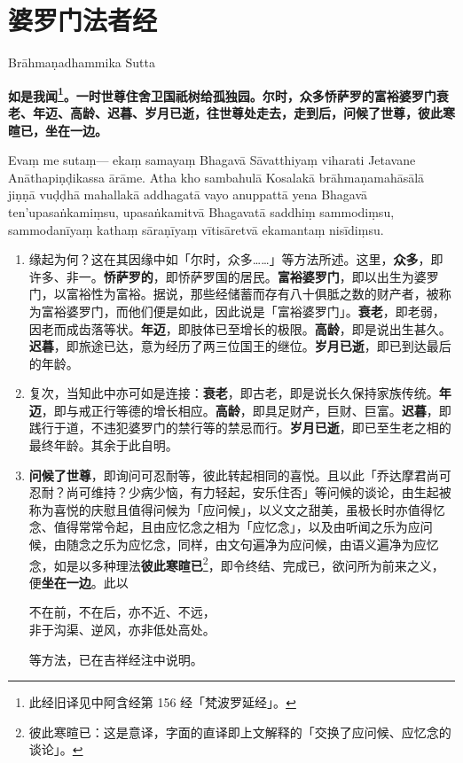 \section{婆罗门法者经}

\begin{center}Brāhmaṇadhammika Sutta\end{center}\vspace{1em}

\textbf{如是我闻\footnote{此经旧译见中阿含经第 156 经「梵波罗延经」。}。一时世尊住舍卫国祇树给孤独园。尔时，众多㤭萨罗的富裕婆罗门衰老、年迈、高龄、迟暮、岁月已逝，往世尊处走去，走到后，问候了世尊，彼此寒暄已，坐在一边。}

Evaṃ me sutaṃ— ekaṃ samayaṃ Bhagavā Sāvatthiyaṃ viharati Jetavane Anāthapiṇḍikassa ārāme. Atha kho sambahulā Kosalakā brāhmaṇamahāsālā jiṇṇā vuḍḍhā mahallakā addhagatā vayo anuppattā yena Bhagavā ten’upasaṅkamiṃsu, upasaṅkamitvā Bhagavatā saddhiṃ sammodiṃsu, sammodanīyaṃ kathaṃ sāraṇīyaṃ vītisāretvā ekamantaṃ nisīdiṃsu.

\begin{enumerate}\item 缘起为何？这在其因缘中如「尔时，众多……」等方法所述。这里，\textbf{众多}，即许多、非一。\textbf{㤭萨罗的}，即㤭萨罗国的居民。\textbf{富裕婆罗门}，即以出生为婆罗门，以富裕性为富裕。据说，那些经储蓄而存有八十俱胝之数的财产者，被称为富裕婆罗门，而他们便是如此，因此说是「富裕婆罗门」。\textbf{衰老}，即老弱，因老而成齿落等状。\textbf{年迈}，即肢体已至增长的极限。\textbf{高龄}，即是说出生甚久。\textbf{迟暮}，即旅途已达，意为经历了两三位国王的继位。\textbf{岁月已逝}，即已到达最后的年龄。
\item 复次，当知此中亦可如是连接：\textbf{衰老}，即古老，即是说长久保持家族传统。\textbf{年迈}，即与戒正行等德的增长相应。\textbf{高龄}，即具足财产，巨财、巨富。\textbf{迟暮}，即践行于道，不违犯婆罗门的禁行等的禁忌而行。\textbf{岁月已逝}，即已至生老之相的最终年龄。其余于此自明。
\item \textbf{问候了世尊}，即询问可忍耐等，彼此转起相同的喜悦。且以此「乔达摩君尚可忍耐？尚可维持？少病少恼，有力轻起，安乐住否」等问候的谈论，由生起被称为喜悦的庆慰且值得问候为「应问候」，以义文之甜美，虽极长时亦值得忆念、值得常常令起，且由应忆念之相为「应忆念」，以及由听闻之乐为应问候，由随念之乐为应忆念，同样，由文句遍净为应问候，由语义遍净为应忆念，如是以多种理法\textbf{彼此寒暄已}\footnote{彼此寒暄已：这是意译，字面的直译即上文解释的「交换了应问候、应忆念的谈论」。}，即令终结、完成已，欲问所为前来之义，便\textbf{坐在一边}。此以\begin{quoting}不在前，不在后，亦不近、不远，\\非于沟渠、逆风，亦非低处高处。\end{quoting}等方法，已在吉祥经注中说明。\end{enumerate}

